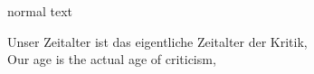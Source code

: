 \documentclass{beamer}
\begin{document}
\begin{frame}
normal text

\begin{adjustwidth}{-3.3em}{1em}
\begin{exe}
\exi{}
\gll Unser Zeitalter ist das eigentliche Zeitalter der Kritik,\\
Our age is the actual age of criticism,\\
\end{exe}%
\end{adjustwidth}
\end{frame}
\end{document}
